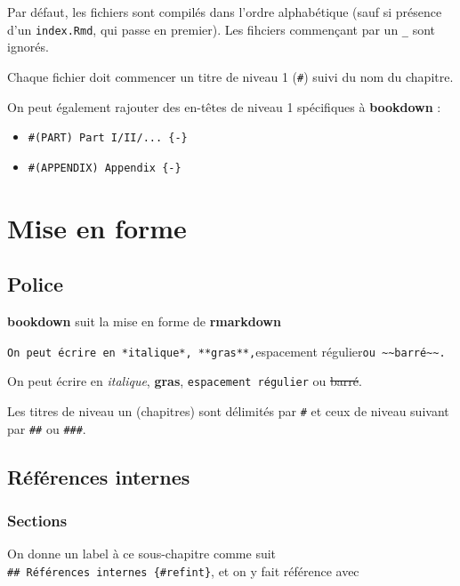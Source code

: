 \documentclass[]{book}
\theoremstyle{definition}
\theoremstyle{definition}
\theoremstyle{definition}
\theoremstyle{remark}
\begin{document}
Par défaut, les fichiers sont compilés dans l'ordre alphabétique (sauf si présence d'un \texttt{index.Rmd}, qui passe en premier). Les fihciers commençant par un \texttt{\_} sont ignorés.

Chaque fichier doit commencer un titre de niveau 1 (\texttt{\#}) suivi du nom du chapitre.

On peut également rajouter des en-têtes de niveau 1 spécifiques à \textbf{bookdown} :

\begin{itemize}
\item
  \texttt{\#(PART)\ Part\ I/II/...\ \{-\}}
\item
  \texttt{\#(APPENDIX)\ Appendix\ \{-\}}
\end{itemize}

\hypertarget{mise-en-forme}{%
\chapter{Mise en forme}\label{mise-en-forme}}

\hypertarget{police}{%
\section{Police}\label{police}}

\textbf{bookdown} suit la mise en forme de \textbf{rmarkdown}

\texttt{On\ peut\ écrire\ en\ *italique*,\ **gras**,}espacement régulier\texttt{ou\ \textasciitilde{}\textasciitilde{}barré\textasciitilde{}\textasciitilde{}.}

On peut écrire en \emph{italique}, \textbf{gras}, \texttt{espacement\ régulier} ou \sout{barré}.

Les titres de niveau un (chapitres) sont délimités par \texttt{\#} et ceux de niveau suivant par \texttt{\#\#} ou \texttt{\#\#\#}.

\hypertarget{refint}{%
\section{Références internes}\label{refint}}

\hypertarget{sections}{%
\subsection{Sections}\label{sections}}

On donne un label à ce sous-chapitre comme suit \texttt{\#\#\ Références\ internes\ \{\#refint\}}, et on y fait référence avec
\end{document}
